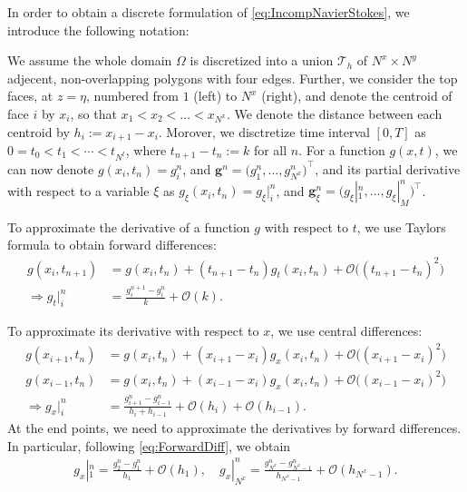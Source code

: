\documentclass[11pt]{article}
\begin{document}
In order to obtain a discrete formulation of \eqref{eq:IncompNavierStokes}, we introduce the following notation:

We assume the whole domain $\Omega$ is discretized into a union $\mathcal{T}_h$ of $N^x \times N^y$ adjecent, non-overlapping
polygons with four edges. Further, we consider the top faces, at $z = \eta$, numbered from $1$ (left) to $N^x$ (right), and denote
the centroid of face $i$ by $x_i$, so that $x_1 < x_2 < \dots < x_{N^x}$. We denote the distance between each centroid by
$h_i := x_{i+1}-x_i$. Morover, we disctretize time interval $[0, T]$ as $0 = t_0 < t_1 < \cdots < t_{N^t}$, where $t_{n+1}-t_n := k$ for all $n$.
For a function $g(x,t)$, we can now denote $g(x_i, t_n) = g_i^n$, and $\bm{g}^n = \Big(g_1^n, \dots, g_{N^x}^n\Big)^\top$, and its partial derivative with respect
to a variable $\xi$ as $g_\xi(x_i, t_n) = g_{\xi}|_i^n$, and $\bm{g}_\xi^n = \Big(g_{\xi}|_1^n, \dots, g_{\xi}|_M^n\Big)^\top$.

To approximate the derivative of a function $g$ with respect to $t$, we use Taylors formula to obtain forward differences:
\begin{align}
    \label{eq:ForwardDiff}
    g(x_i, t_{n+1})       & = g(x_i, t_n) +  (t_{n+1}-t_n)g_t(x_i, t_n) + \mathcal{O}\big((t_{n+1}-t_n)^2\big) \\
    \Rightarrow g_t|_i^n & = \frac{g_i^{n+1}-g_i^n}{k} + \mathcal{O}(k).
\end{align}

To approximate its derivative with respect to $x$, we use central differences:
\begin{align*}
    g(x_{i+1}, t_n)       & = g(x_i, t_n) +  (x_{i+1}-x_i)g_x(x_i, t_n) + \mathcal{O}\big((x_{i+1}-x_i)^2\big) \\
    g(x_{i-1}, t_n)       & = g(x_i, t_n) +  (x_{i-1}-x_i)g_x(x_i, t_n) + \mathcal{O}\big((x_{i-1}-x_i)^2\big) \\    
    \Rightarrow g_x|_i^n & = \frac{g_{i+1}^n-g_{i-1}^n}{h_i + h_{i-1}} + \mathcal{O}(h_i) + \mathcal{O}(h_{i-1}).
\end{align*}
At the end points, we need to approximate the derivatives by forward differences. In particular, following \eqref{eq:ForwardDiff}, 
we obtain
\begin{align*}
    g_x|_1^n = \frac{g_2^n -g_1^n}{h_1} + \mathcal{O}(h_1), \quad g_x|_{N^x}^n = \frac{g_{N^x}^n -g_{N^x-1}^n}{h_{N^x-1}} + \mathcal{O}(h_{N^x-1}).
\end{align*}
\end{document}
